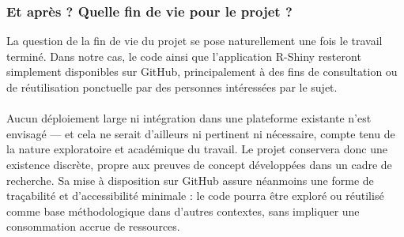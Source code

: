 \documentclass[12pt]{article}
\begin{document}
\subsubsection*{Et après ? Quelle fin de vie pour le projet ?}
La question de la fin de vie du projet se pose naturellement une fois le travail terminé. Dans notre cas, le code ainsi que l’application R-Shiny resteront simplement disponibles sur GitHub, principalement à des fins de consultation ou de réutilisation ponctuelle par des personnes intéressées par le sujet.\\
\\
Aucun déploiement large ni intégration dans une plateforme existante n’est envisagé — et cela ne serait d’ailleurs ni pertinent ni nécessaire, compte tenu de la nature exploratoire et académique du travail. Le projet conservera donc une existence discrète, propre aux preuves de concept développées dans un cadre de recherche. Sa mise à disposition sur GitHub assure néanmoins une forme de traçabilité et d’accessibilité minimale : le code pourra être exploré ou réutilisé comme base méthodologique dans d’autres contextes, sans impliquer une consommation accrue de ressources.
\end{document}
